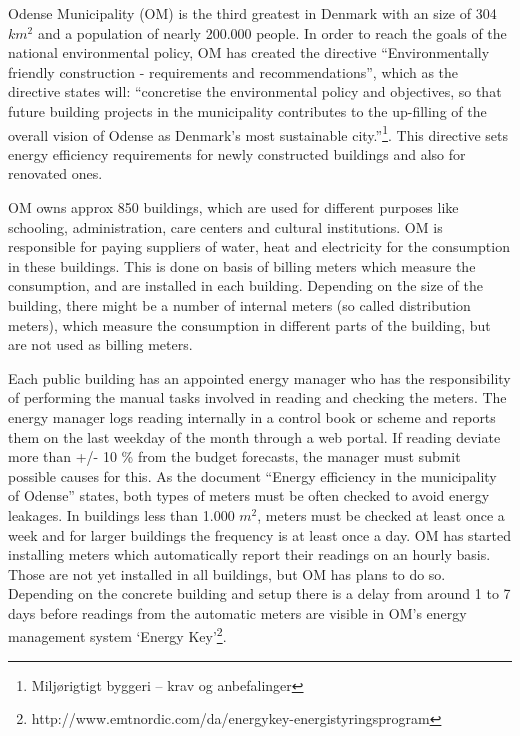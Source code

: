Odense Municipality (OM) is the third greatest in Denmark with an size of 304 $km^2$ and a population of nearly 200.000 people. In order to reach the goals of the national environmental policy, OM has created the directive “Environmentally friendly construction - requirements and recommendations”,  which as the directive states will: “concretise the environmental policy and objectives, so that future building projects in the municipality contributes to the up-filling of the overall vision of Odense as Denmark's most sustainable city.”\footnote{Miljørigtigt byggeri – krav og anbefalinger}. This directive sets energy efficiency requirements for newly constructed buildings and also for renovated ones.

OM owns approx 850 buildings, which are used for different purposes like schooling, administration, care centers and cultural institutions. OM is responsible for paying suppliers of water, heat and electricity for the consumption in these buildings. This is done on basis of billing meters which measure the consumption, and are installed in each building. Depending on the size of the building, there might be a number of internal meters (so called distribution meters), which measure the consumption in different parts of the building, but are not used as billing meters. 

Each public building has an appointed energy manager who has the responsibility of performing the manual tasks involved in reading and checking the meters. The energy manager logs reading internally in a control book or scheme and reports them on the last weekday of the month through a web portal. If reading deviate more than +/- 10 \% from the budget forecasts, the manager must submit possible causes for this. As the document “Energy efficiency in the municipality of Odense” states, both types of meters must be often checked to avoid energy leakages.  In buildings less than 1.000 $m^2$, meters must be checked at least once a week and for larger buildings the frequency is at least once a day. OM has started installing meters which automatically report their readings on an hourly basis. Those are not yet installed in all buildings, but OM has plans to do so. Depending on the concrete building and setup there is a delay from around 1 to 7 days before readings from the automatic meters are visible in OM’s energy management system ‘Energy Key’\footnote{http://www.emtnordic.com/da/energykey-energistyringsprogram}.

